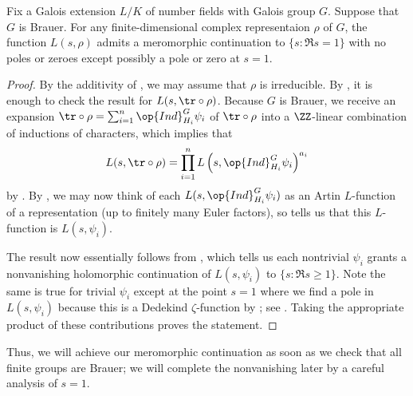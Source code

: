 \documentclass[../thesis.tex]{subfiles}
\begin{document}
\begin{lemma} \label{lem:brauer-to-artin}
	Fix a Galois extension $L/K$ of number fields with Galois group $G$. Suppose that $G$ is Brauer. For any finite-dimensional complex representaion $\rho$ of $G$, the function $L(s,\rho)$ admits a meromorphic continuation to $\{s:\Re s=1\}$ with no poles or zeroes except possibly a pole or zero at $s=1$.
\end{lemma}
\begin{proof}
	By the additivity of , we may assume that $\rho$ is irreducible. By , it is enough to check the result for $L(s,{\tr}\circ\rho)$. Because $G$ is Brauer, we receive an expansion ${\tr}\circ\rho=\sum_{i=1}^n\op{Ind}_{H_i}^G\psi_i$ of ${\tr}\circ\rho$ into a $\ZZ$-linear combination of inductions of characters, which implies that
	\[L(s,{\tr}\circ\rho)=\prod_{i=1}^nL\left(s,\op{Ind}_{H_i}^G\psi_i\right)^{a_i}\]
	by . By , we may now think of each $L(s,\op{Ind}_{H_i}^G\psi_i)$ as an Artin $L$-function of a representation (up to finitely many Euler factors), so  tells us that this $L$-function is $L(s,\psi_i)$.
	
	The result now essentially follows from , which tells us each nontrivial $\psi_i$ grants a nonvanishing holomorphic continuation of $L(s,\psi_i)$ to $\{s:\Re s\ge1\}$. Note the same is true for trivial $\psi_i$ except at the point $s=1$ where we find a pole in $L(s,\psi_i)$ because this is a Dedekind $\zeta$-function by ; see . Taking the appropriate product of these contributions proves the statement.
\end{proof}
Thus, we will achieve our meromorphic continuation as soon as we check that all finite groups are Brauer; we will complete the nonvanishing later by a careful analysis of $s=1$.
\end{document}
